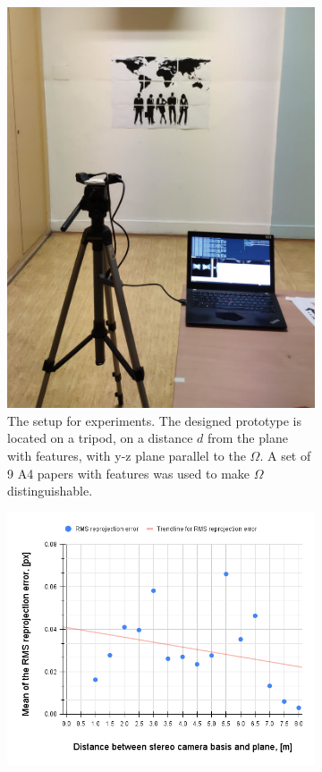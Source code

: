 \begin{figure}[ht]
  \begin{subfigure}[ht]{0.29\textwidth}
    \centering
    \includegraphics[width=\textwidth]{graphics/experiment_setup.png}
    \caption[The setup for experiments]{The setup for experiments. 
    The designed prototype is located on a tripod, on a distance $d$ from the plane with features, with y-z plane parallel to the $\Omega$. 
    A set of 9 A4 papers with features was used to make $\Omega$ distinguishable.}
    \label{fig:exp_process}
  \end{subfigure}
  \hfill
  \begin{subfigure}[ht]{0.7\textwidth}
    \centering
    \includegraphics[width=\textwidth]{graphics/experiment_1_repro_error.png}

\end{subfigure}
\end{figure}
